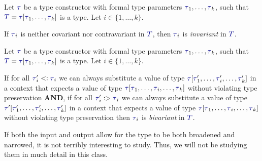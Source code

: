 \begin{definition}[Invariance]\label{def:Type_Invariance}
  Let $\DataType$ be a type constructor with formal type parameters $\DataType_{1}, \ldots , \DataType_{k}$, such that $\SemanticType{T} = \DataType [\DataType_{1}, \ldots, \DataType_{k}]$ is a type.
  Let $i \in \lbrace 1,\ldots, k \rbrace$.


  If $\DataType_{i}$ is neither covariant nor contravariant in $\SemanticType{T}$, then $\DataType_{i}$ is \emph{invariant} in $\SemanticType{T}$.
\end{definition}

\begin{definition}[Bivariance]\label{def:Type_Bivariance}
  Let $\DataType$ be a type constructor with formal type parameters $\DataType_{1}, \ldots , \DataType_{k}$, such that $\SemanticType{T} = \DataType [\DataType_{1}, \ldots, \DataType_{k}]$ is a type.
  Let $i \in \lbrace 1,\ldots, k \rbrace$.

  If for all $\DataType_{i}' <: \DataType_{i}$ we can always substitute a value of type $\DataType [\DataType_{1}',\ldots, \DataType_{i}', \ldots, \DataType_{k}']$ in a context that expects a value of type $\DataType [\DataType_{1}, \ldots, \DataType_{i}, \ldots, \DataType_{k}]$ without violating type preservation \textbf{AND}, if for all $\DataType_{i}' :> \DataType_{i}$ we can always substitute a value of type $\DataType' [\DataType_{1}', \ldots, \DataType_{i}', \ldots, \DataType_{k}']$ in a context that expects a value of type $\DataType [\DataType_{1}, \ldots, \DataType_{i}, \ldots, \DataType_{k}]$ without violating type preservation then $\DataType_{i}$ is \emph{bivariant} in $\SemanticType{T}$.

  \begin{remark}
    If both the input and output allow for the type to be both broadened and narrowed, it is not terribly interesting to study.
    Thus, we will not be studying them in much detail in this class.
  \end{remark}
\end{definition}

